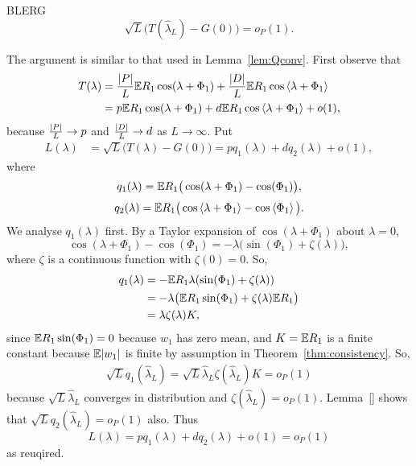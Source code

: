 \documentclass[journal]{IEEEtran}
\begin{document}
\begin{lemma}\label{lem:HLtoG} BLERG
\[
\sqrt{L}\big( T(\hat{\lambda}_L) - G(0) \big) = o_P(1).
\]
\end{lemma}
\begin{IEEEproof}
The argument is similar to that used in Lemma~\ref{lem:Qconv}.  First observe that
\begin{align*}
T(\lambda) &= \frac{{\left\vert P \right\vert}}{L}{\mathbb E} R_1\cos(\lambda + \Phi_1) + \frac{{\left\vert D \right\vert}}{L} {\mathbb E} R_1\cos\left\langle \lambda + \Phi_1 \right\rangle \\
&=  p {\mathbb E} R_1\cos(\lambda + \Phi_1) + d{\mathbb E} R_1\cos\left\langle \lambda + \Phi_1 \right\rangle + o(1),
\end{align*}
because $\frac{{\left\vert P \right\vert}}{L} \rightarrow p$ and $\frac{{\left\vert D \right\vert}}{L} \rightarrow d$ as $L\rightarrow\infty$. Put
\begin{align*}
L(\lambda) &= \sqrt{L}\big( T(\lambda) - G(0) \big) = p q_1(\lambda) + d q_2(\lambda) + o(1),
\end{align*}
where
\[
q_1(\lambda) = {\mathbb E} R_1\big( \cos(\lambda + \Phi_1) - \cos(\Phi_1) \big),
\]
\begin{equation}
q_2(\lambda) = {\mathbb E} R_1\big( \cos\left\langle \lambda + \Phi_1 \right\rangle - \cos\left\langle \Phi_1 \right\rangle \big). \label{eq:q2def}
\end{equation}
We analyse $q_1(\lambda)$ first.  By a Taylor expansion of $\cos(\lambda + \Phi_1)$ about $\lambda = 0$,
\[
\cos(\lambda + \Phi_1) - \cos(\Phi_1) = -\lambda \big( \sin(\Phi_1) + \zeta(\lambda) \big),
\]
where $\zeta$ is a continuous function with $\zeta(0) = 0$. So,
\begin{align*}
q_1(\lambda) &= -{\mathbb E} R_1\lambda(\sin(\Phi_1) +  \zeta(\lambda)) \\
&= -\lambda \big( {\mathbb E} R_1\sin(\Phi_1) +  \zeta(\lambda) {\mathbb E} R_1 \big) \\
&= \lambda \zeta(\lambda) K,
\end{align*}
since ${\mathbb E} R_1\sin(\Phi_1) = 0$ because $w_1$ has zero mean,  and $K = {\mathbb E} R_1$ is a finite constant because ${\mathbb E}{\left\vert w_1 \right\vert}$ is finite by assumption in Theorem~\ref{thm:consistency}.  So, 
\begin{align*}
\sqrt{L} q_1(\hat{\lambda}_L) = \sqrt{L} \hat{\lambda}_L \zeta(\hat{\lambda}_L) K = o_P(1)
\end{align*}
because $\sqrt{L} \hat{\lambda}_L$ converges in distribution and $\zeta(\hat{\lambda}_L) = o_P(1)$.  Lemma~\ref{} shows that $\sqrt{L} q_2(\hat{\lambda}_L) = o_P(1)$ also.  Thus 
\[
L(\lambda) = p q_1(\lambda) + d q_2(\lambda) + o(1) = o_P(1)
\]
as reuqired.
\end{IEEEproof}
\end{document}

